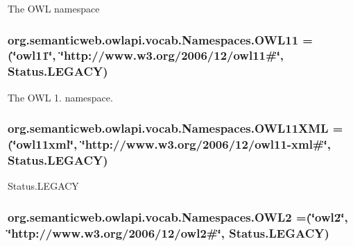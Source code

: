 The O\-W\-L namespace \hypertarget{enumorg_1_1semanticweb_1_1owlapi_1_1vocab_1_1_namespaces_a2c4112c773efd5b375d610e895f29b5f}{
\subsubsection[{O\-W\-L11}]{\setlength{\rightskip}{0pt plus 5cm}org.\-semanticweb.\-owlapi.\-vocab.\-Namespaces.\-O\-W\-L11 =(\char`\"{}owl11\char`\"{}, \char`\"{}http\-://www.\-w3.\-org/2006/12/owl11\#\char`\"{}, Status.\-L\-E\-G\-A\-C\-Y)}}\label{enumorg_1_1semanticweb_1_1owlapi_1_1vocab_1_1_namespaces_a2c4112c773efd5b375d610e895f29b5f}
The O\-W\-L 1. namespace. \hypertarget{enumorg_1_1semanticweb_1_1owlapi_1_1vocab_1_1_namespaces_af36dd330a7d7bc2a25a65e50de1ad3ff}{
\subsubsection[{O\-W\-L11\-X\-M\-L}]{\setlength{\rightskip}{0pt plus 5cm}org.\-semanticweb.\-owlapi.\-vocab.\-Namespaces.\-O\-W\-L11\-X\-M\-L =(\char`\"{}owl11xml\char`\"{}, \char`\"{}http\-://www.\-w3.\-org/2006/12/owl11-\/xml\#\char`\"{}, Status.\-L\-E\-G\-A\-C\-Y)}}\label{enumorg_1_1semanticweb_1_1owlapi_1_1vocab_1_1_namespaces_af36dd330a7d7bc2a25a65e50de1ad3ff}
Status.\-L\-E\-G\-A\-C\-Y \hypertarget{enumorg_1_1semanticweb_1_1owlapi_1_1vocab_1_1_namespaces_ae6d1d1c211d0540debf50f039d557151}{
\subsubsection[{O\-W\-L2}]{\setlength{\rightskip}{0pt plus 5cm}org.\-semanticweb.\-owlapi.\-vocab.\-Namespaces.\-O\-W\-L2 =(\char`\"{}owl2\char`\"{}, \char`\"{}http\-://www.\-w3.\-org/2006/12/owl2\#\char`\"{}, Status.\-L\-E\-G\-A\-C\-Y)}}\label{enumorg_1_1semanticweb_1_1owlapi_1_1vocab_1_1_namespaces_ae6d1d1c211d0540debf50f039d557151}

